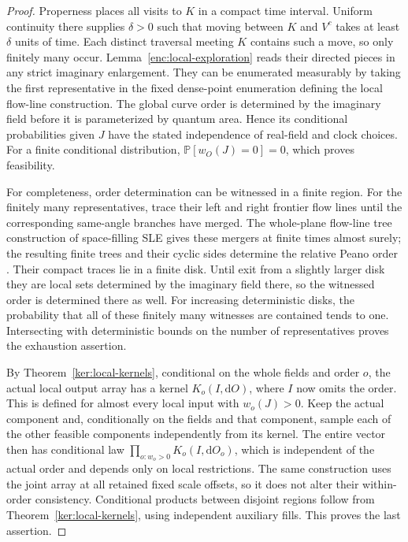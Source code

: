 \documentclass[11pt]{article}
\numberwithin{equation}{section}
\theoremstyle{definition}
\theoremstyle{remark}
\newcommand{\1}{\mathbf 1}
\begin{document}
\begin{proof}
Properness places all visits to \(K\) in a compact time interval.
Uniform continuity there supplies \(\delta>0\) such that moving
between \(K\) and \(V^c\) takes at least \(\delta\) units of time.
Each distinct traversal meeting \(K\) contains such a move, so only
finitely many occur.  Lemma~\ref{enc:local-exploration}
reads their directed pieces in any strict imaginary enlargement.
They can be enumerated measurably by taking the first representative
in the fixed dense-point enumeration defining the local flow-line
construction.  The global curve order is determined by the imaginary
field before it is parameterized by quantum area.  Hence its
conditional probabilities given \(J\) have the stated independence
of real-field and clock choices.  For a finite conditional distribution,
\(\mathbb P[w_O(J)=0]=0\), which proves feasibility.

For completeness, order determination can be witnessed in a finite
region.  For the finitely many representatives, trace their left and
right frontier flow lines until the corresponding same-angle branches
have merged.  The whole-plane flow-line tree construction of
space-filling SLE gives these mergers at finite times almost surely;
the resulting finite trees and their cyclic sides determine the
relative Peano order \cite{MillerSheffieldIGIV}.  Their compact traces lie in a
finite disk.  Until exit from a slightly larger disk they are local
sets determined by the imaginary field there, so the witnessed order
is determined there as well.  For increasing deterministic disks,
the probability that all of these finitely many witnesses are
contained tends to one.  Intersecting with deterministic bounds on
the number of representatives proves the exhaustion assertion.

By Theorem~\ref{ker:local-kernels}, conditional on the whole fields
and order \(o\), the actual local output array has a kernel
\(K_o(I,\mathrm d O)\), where \(I\) now omits the order.  This is defined
for almost every local input with \(w_o(J)>0\).  Keep the actual
component and, conditionally on the fields and that component,
sample each of the other feasible components independently from its
kernel.  The entire vector then has conditional law
\(\prod_{o:w_o>0}K_o(I,\mathrm d O_o)\), which is independent of the actual
order and depends only on local restrictions.  The same construction
uses the joint array at all retained fixed scale offsets, so it does not
alter their within-order consistency.  Conditional products between
disjoint regions follow from Theorem~\ref{ker:local-kernels}, using
independent auxiliary fills.  This proves the last assertion.
\end{proof}
\end{document}

